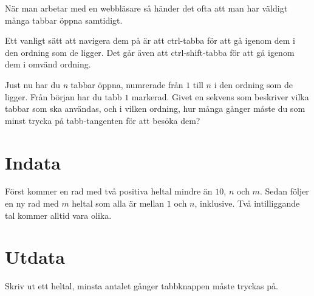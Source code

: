 
När man arbetar med en webbläsare så händer det ofta att man har väldigt många
tabbar öppna samtidigt.

Ett vanligt sätt att navigera dem på är att ctrl-tabba för att gå igenom dem i
den ordning som de ligger. Det går även att ctrl-shift-tabba för att gå igenom
dem i omvänd ordning.

Just nu har du \emph{n} tabbar öppna, numrerade från $1$ till $n$ i den ordning
som de ligger. Från början har du tabb $1$ markerad. Givet en sekvens som
beskriver vilka tabbar som ska användas, och i vilken ordning, hur många gånger
måste du som minst trycka på tabb-tangenten för att besöka dem?

\section*{Indata}

Först kommer en rad med två positiva heltal mindre än $10$, $n$ och $m$. Sedan
följer en ny rad med $m$ heltal som alla är mellan $1$ och $n$, inklusive. Två
intilliggande tal kommer alltid vara olika.

\section*{Utdata}

Skriv ut ett heltal, minsta antalet gånger tabbknappen måste tryckas på.
